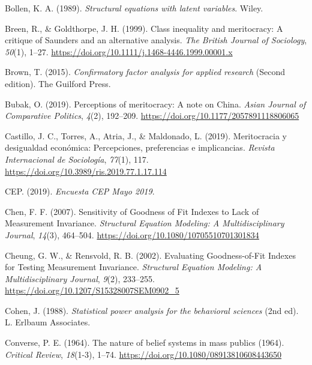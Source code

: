 \documentclass[
  10pt,
  a4paper,
]{article}
\newlength{\cslhangindent}
\newenvironment{CSLReferences}[2] %
 {\begin{list}{}{%
  \setlength{\itemindent}{0pt}
  \setlength{\leftmargin}{0pt}
  \setlength{\parsep}{0pt}
  \ifodd #1
   \setlength{\leftmargin}{\cslhangindent}
   \setlength{\itemindent}{-1\cslhangindent}
  \fi
  \setlength{\itemsep}{#2\baselineskip}}}
 {\end{list}}
\begin{document}
\begin{CSLReferences}{1}{0}
Bollen, K. A. (1989). \emph{Structural equations with latent variables}. {Wiley}.

Breen, R., \& Goldthorpe, J. H. (1999). Class inequality and meritocracy: A critique of {Saunders} and an alternative analysis. \emph{The British Journal of Sociology}, \emph{50}(1), 1--27. \url{https://doi.org/10.1111/j.1468-4446.1999.00001.x}

Brown, T. (2015). \emph{Confirmatory factor analysis for applied research} (Second edition). {The Guilford Press}.

Bubak, O. (2019). Perceptions of meritocracy: {A} note on {China}. \emph{Asian Journal of Comparative Politics}, \emph{4}(2), 192--209. \url{https://doi.org/10.1177/2057891118806065}

Castillo, J. C., Torres, A., Atria, J., \& Maldonado, L. (2019). Meritocracia y desigualdad económica: {Percepciones}, preferencias e implicancias. \emph{Revista Internacional de Sociología}, \emph{77}(1), 117. \url{https://doi.org/10.3989/ris.2019.77.1.17.114}

CEP. (2019). \emph{Encuesta {CEP Mayo} 2019}.

Chen, F. F. (2007). Sensitivity of {Goodness} of {Fit Indexes} to {Lack} of {Measurement Invariance}. \emph{Structural Equation Modeling: A Multidisciplinary Journal}, \emph{14}(3), 464--504. \url{https://doi.org/10.1080/10705510701301834}

Cheung, G. W., \& Rensvold, R. B. (2002). Evaluating {Goodness-of-Fit Indexes} for {Testing Measurement Invariance}. \emph{Structural Equation Modeling: A Multidisciplinary Journal}, \emph{9}(2), 233--255. \url{https://doi.org/10.1207/S15328007SEM0902_5}

Cohen, J. (1988). \emph{Statistical power analysis for the behavioral sciences} (2nd ed). {L. Erlbaum Associates}.

Converse, P. E. (1964). The nature of belief systems in mass publics (1964). \emph{Critical Review}, \emph{18}(1-3), 1--74. \url{https://doi.org/10.1080/08913810608443650}


\end{CSLReferences}
\end{document}
